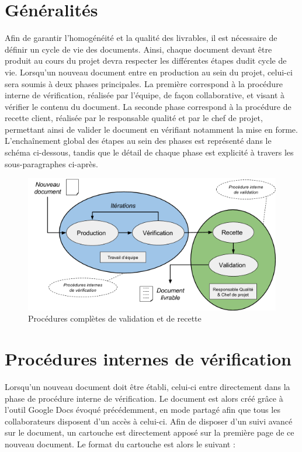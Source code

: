 \section{Généralités}

Afin de garantir l’homogénéité et la qualité des livrables, il est nécessaire de définir un cycle de vie des documents. Ainsi, chaque document devant être produit au cours du projet devra respecter les différentes étapes dudit cycle de vie. Lorsqu’un nouveau document entre en production au sein du projet, celui-ci sera soumis à deux phases principales. La première correspond à la procédure interne de vérification, réalisée par l’équipe, de façon collaborative, et visant à vérifier le contenu du document. La seconde phase correspond à la procédure de recette client, réalisée par le responsable qualité et par le chef de projet, permettant ainsi de valider le document en vérifiant notamment la mise en forme. L’enchaînement global des étapes au sein des phases est représenté dans le schéma ci-dessous, tandis que le détail de chaque phase est explicité à travers les sous-paragraphes ci-après.

\begin{figure}[H]
    \centering
    \label{fig-valid-recette}
    \includegraphics[scale=0.5]{figures/validation_recette.png}
    \caption{Procédures complètes de validation et de recette}
\end{figure}

\section{Procédures internes de vérification}
    
Lorsqu’un nouveau document doit être établi, celui-ci entre directement dans la phase de procédure interne de vérification. Le document est alors créé grâce à l’outil Google Docs évoqué précédemment, en mode partagé afin que tous les collaborateurs disposent d’un accès à celui-ci. Afin de disposer d’un suivi avancé sur le document, un cartouche est directement apposé sur la première page de ce nouveau document. Le format du cartouche est alors le suivant : \\


